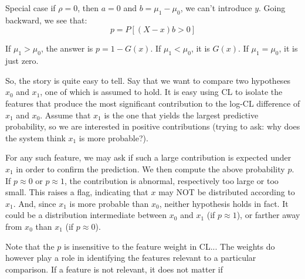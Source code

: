 \documentclass[english]{scrartcl}
\begin{document}
Special case if $\rho=0$, then $a=0$ and $b=\mu_1-\mu_0$, we can't introduce $y$. Going backward, we see that:
$$
p = P[(X-x)b>0]
$$

If $\mu_1>\mu_0$, the answer is $p=1-G(x)$. If $\mu_1<\mu_0$, it is $G(x)$. If $\mu_1=\mu_0$, it is just zero.

So, the story is quite easy to tell. Say that we want to compare two hypotheses $x_0$ and $x_1$, one of which is assumed to hold. It is easy using CL to isolate the features that produce the most significant contribution to the log-CL difference of $x_1$ and $x_0$. Assume that $x_1$ is the one that yields the largest predictive probability, so we are interested in positive contributions (trying to ask: why does the system think $x_1$ is more probable?). 

For any such feature, we may ask if such a large contribution is expected under $x_1$ in order to confirm the prediction. We then compute the above probability $p$. If $p\approx 0$ or $p\approx 1$, the contribution is abnormal, respectively too large or too small. This raises a flag, indicating that $x$ may NOT be distributed according to $x_1$. And, since $x_1$ is more probable than $x_0$, neither hypothesis holds in fact. It could be a distribution intermediate between $x_0$ and $x_1$ (if $p\approx 1$), or farther away from $x_0$ than $x_1$ (if $p\approx 0$).

Note that the $p$ is insensitive to the feature weight in CL... The weights do however play a role in identifying the features relevant to a particular comparison. If a feature is not relevant, it does not matter if 


%



\end{document}
